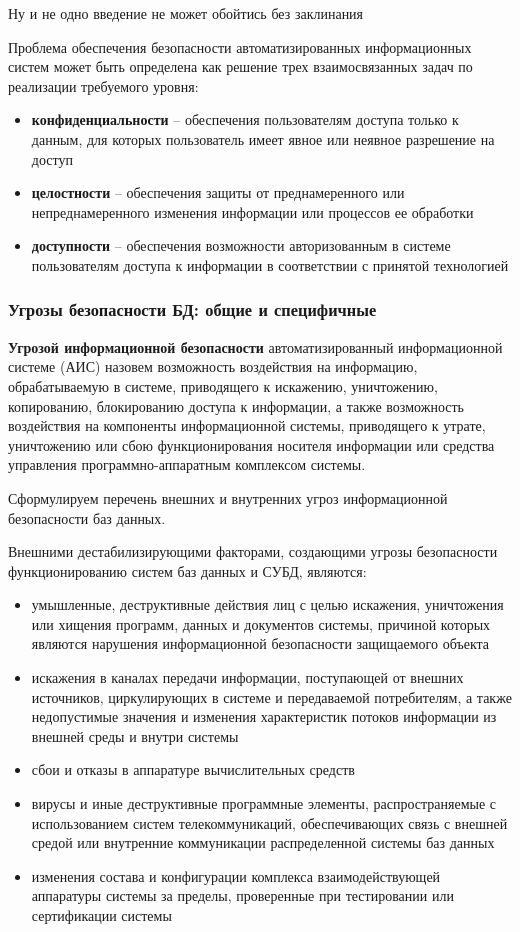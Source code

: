 Ну и не одно введение не может обойтись без заклинания
\begin{grayquote}
	Проблема обеспечения безопасности автоматизированных информационных систем может быть определена как решение трех взаимосвязанных задач по реализации требуемого уровня:
	\begin{itemize}
		\item \textbf{конфиденциальности} -- обеспечения пользователям доступа только к данным, для которых пользователь имеет явное или неявное разрешение на доступ
		\item \textbf{целостности} -- обеспечения защиты от преднамеренного или непреднамеренного изменения информации или процессов ее обработки
		\item \textbf{доступности} -- обеспечения возможности авторизованным в системе пользователям доступа к информации в соответствии с принятой технологией
	\end{itemize}
\end{grayquote}

\subsubsection{Угрозы безопасности БД: общие и специфичные}
\textbf{Угрозой информационной безопасности} автоматизированный информационной системе (АИС) назовем возможность воздействия на информацию, обрабатываемую в системе, приводящего к искажению, уничтожению, копированию, блокированию доступа к информации, а также возможность воздействия на компоненты информационной системы, приводящего к утрате, уничтожению или сбою функционирования носителя информации или средства управления программно-аппаратным комплексом системы.

Сформулируем перечень внешних и внутренних угроз информационной безопасности баз данных.

Внешними дестабилизирующими факторами, создающими угрозы безопасности функционированию систем баз данных и СУБД, являются:
\begin{itemize}
	\item умышленные, деструктивные действия лиц с целью искажения, уничтожения или хищения программ, данных и документов системы, причиной которых являются нарушения информационной безопасности защищаемого объекта
	\item искажения в каналах передачи информации, поступающей от внешних источников, циркулирующих в системе и передаваемой потребителям, а также недопустимые значения и изменения характеристик потоков информации из внешней среды и внутри системы
	\item сбои и отказы в аппаратуре вычислительных средств
	\item вирусы и иные деструктивные программные элементы, распространяемые с использованием систем телекоммуникаций, обеспечивающих связь с внешней средой или внутренние коммуникации распределенной системы баз данных
	\item изменения состава и конфигурации комплекса взаимодействующей аппаратуры системы за пределы, проверенные при тестировании или сертификации системы
\end{itemize}

